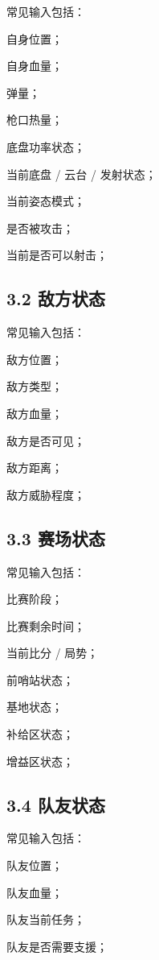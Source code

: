 \documentclass[a4paper,12pt]{book}
\begin{document}
{常见输入包括：

\item 自身位置；
\item 自身血量；
\item 弹量；
\item 枪口热量；
\item 底盘功率状态；
\item 当前底盘 / 云台 / 发射状态；
\item 当前姿态模式；
\item 是否被攻击；
\item 当前是否可以射击；

\subsection{3.2 敌方状态}

常见输入包括：

\item 敌方位置；
\item 敌方类型；
\item 敌方血量；
\item 敌方是否可见；
\item 敌方距离；
\item 敌方威胁程度；

\subsection{3.3 赛场状态}

常见输入包括：

\item 比赛阶段；
\item 比赛剩余时间；
\item 当前比分 / 局势；
\item 前哨站状态；
\item 基地状态；
\item 补给区状态；
\item 增益区状态；


\subsection{3.4 队友状态}

常见输入包括：

\item 队友位置；
\item 队友血量；
\item 队友当前任务；
\item 队友是否需要支援；


}
\end{document}
